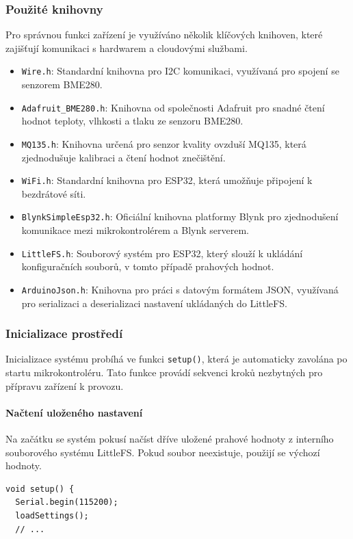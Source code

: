 \documentclass[12pt, twoside]{article} %
\begin{document}
\subsubsection{Použité knihovny}
Pro správnou funkci zařízení je využíváno několik klíčových knihoven, které zajišťují komunikaci s hardwarem a cloudovými službami.
\begin{itemize}
    \item \texttt{Wire.h}: Standardní knihovna pro I2C komunikaci, využívaná pro spojení se senzorem BME280.
    \item \texttt{Adafruit\_BME280.h}: Knihovna od společnosti Adafruit pro snadné čtení hodnot teploty, vlhkosti a tlaku ze senzoru BME280.
    \item \texttt{MQ135.h}: Knihovna určená pro senzor kvality ovzduší MQ135, která zjednodušuje kalibraci a čtení hodnot znečištění.
    \item \texttt{WiFi.h}: Standardní knihovna pro ESP32, která umožňuje připojení k bezdrátové síti.
    \item \texttt{BlynkSimpleEsp32.h}: Oficiální knihovna platformy Blynk pro zjednodušení komunikace mezi mikrokontrolérem a Blynk serverem.
    \item \texttt{LittleFS.h}: Souborový systém pro ESP32, který slouží k ukládání konfiguračních souborů, v tomto případě prahových hodnot.
    \item \texttt{ArduinoJson.h}: Knihovna pro práci s datovým formátem JSON, využívaná pro serializaci a deserializaci nastavení ukládaných do LittleFS.
\end{itemize}

\subsubsection{Inicializace prostředí}
Inicializace systému probíhá ve funkci \texttt{setup()}, která je automaticky zavolána po startu mikrokontroléru. Tato funkce provádí sekvenci kroků nezbytných pro přípravu zařízení k provozu.

\paragraph{Načtení uloženého nastavení}
Na začátku se systém pokusí načíst dříve uložené prahové hodnoty z interního souborového systému LittleFS. Pokud soubor neexistuje, použijí se výchozí hodnoty.
\begin{lstlisting}
void setup() {
  Serial.begin(115200);
  loadSettings();
  // ...
\end{lstlisting}
\end{document}
